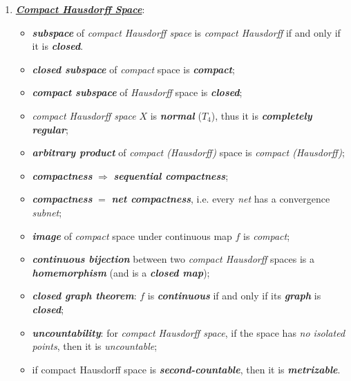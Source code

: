 \documentclass[11pt]{article}
\begin{document}
\begin{itemize}
\begin{remark}
\begin{enumerate}
\item \underline{\emph{\textbf{Compact Hausdorff Space}}}:
\begin{itemize}
\item \emph{\textbf{subspace}} of \emph{compact Hausdorff space} is \emph{compact Hausdorff} if and only if it is \emph{\textbf{closed}}. 
\item \emph{\textbf{closed subspace}} of \emph{compact} space is \emph{\textbf{compact}}; 
\item \emph{\textbf{compact subspace}} of \emph{Hausdorff} space is \emph{\textbf{closed}};
\item \emph{compact Hausdorff space} $X$ is \textbf{\emph{normal}} ($T_4$), thus it is \emph{\textbf{completely regular}};
\item \emph{\textbf{arbitrary product}} of \emph{compact (Hausdorff)}  space is \emph{compact (Hausdorff)};
\item \emph{\textbf{compactness}} $\Rightarrow$ \emph{\textbf{sequential compactness}};
\item  \emph{\textbf{compactness}} $=$ \emph{\textbf{net compactness}}, i.e. every \emph{net} has a convergence \emph{subnet};
\item \emph{\textbf{image}} of \emph{compact} space under continuous map $f$ is \emph{compact};
\item \emph{\textbf{continuous bijection}} between two \emph{compact Hausdorff} spaces is a \emph{\textbf{homemorphism}} (and is a \emph{\textbf{closed map}});
\item \emph{\textbf{closed graph theorem}}: $f$ is \emph{\textbf{continuous}} if and only if its \emph{\textbf{graph}} is \emph{\textbf{closed}};
\item \emph{\textbf{uncountability}}: for \emph{compact Hausdorff space}, if the space has \emph{no isolated points}, then it is \emph{uncountable};
\item if compact Hausdorff space is \emph{\textbf{second-countable}}, then it is \emph{\textbf{metrizable}}.
\end{itemize}
\end{enumerate}
\end{remark}
\end{itemize}


\end{document}
